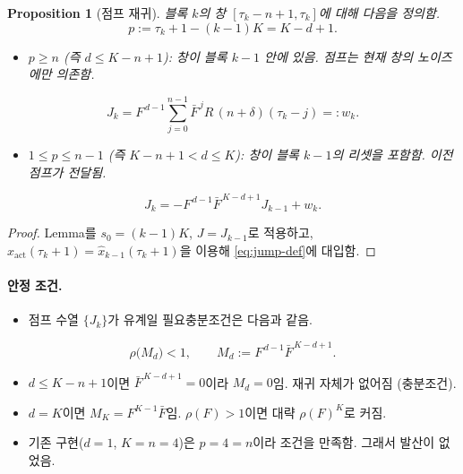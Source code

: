 \documentclass[11pt,a4paper]{article}
\newtheorem{proposition}{Proposition}
\newcommand{\Fb}{\bar F}
\begin{document}
\begin{proposition}[점프 재귀]
블록 $k$의 창 $[\tau_k-n+1,\tau_k]$에 대해 다음을 정의함.
\begin{equation}
p:=\tau_k+1-(k-1)K=K-d+1 .
\end{equation}
\begin{itemize}
\item $p\ge n$ (즉 $d\le K-n+1$): 창이 블록 $k-1$ 안에 있음. 점프는 현재 창의 노이즈에만 의존함.
\end{itemize}
\begin{equation}
J_k=F^{\,d-1}\sum_{j=0}^{n-1}\Fb^{\,j}R\,(n+\delta)(\tau_k-j)=:w_k .
\end{equation}
\begin{itemize}
\item $1\le p\le n-1$ (즉 $K-n+1<d\le K$): 창이 블록 $k-1$의 리셋을 포함함. 이전 점프가 전달됨.
\end{itemize}
\begin{equation}
J_k=-F^{\,d-1}\Fb^{\,K-d+1}J_{k-1}+w_k .
\label{eq:jump-rec}
\end{equation}
\end{proposition}
\begin{proof}
Lemma를 $s_0=(k-1)K$, $J=J_{k-1}$로 적용하고, $\hat x_{\mathrm{act}}(\tau_k+1)=\hat x_{k-1}(\tau_k+1)$을 이용해 \eqref{eq:jump-def}에 대입함.
\end{proof}

\paragraph{안정 조건.}
\begin{itemize}
\item 점프 수열 $\{J_k\}$가 유계일 필요충분조건은 다음과 같음.
\end{itemize}
\begin{equation}
\rho\bigl(M_d\bigr)<1,\qquad M_d:=F^{\,d-1}\Fb^{\,K-d+1}.
\label{eq:dstab}
\end{equation}
\begin{itemize}
\item $d\le K-n+1$이면 $\Fb^{\,K-d+1}=0$이라 $M_d=0$임. 재귀 자체가 없어짐 (충분조건).
\item $d=K$이면 $M_K=F^{K-1}\Fb$임. $\rho(F)>1$이면 대략 $\rho(F)^{K}$로 커짐.
\item 기존 구현($d=1$, $K=n=4$)은 $p=4=n$이라 조건을 만족함. 그래서 발산이 없었음.
\end{itemize}
\end{document}
